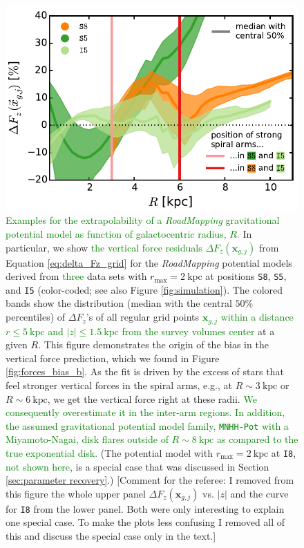 \documentclass[iop,revtex4,numberedappendix,appendixfloats]{emulateapj}
\newcommand{\vect}[1]{\boldsymbol{#1}}
\newcommand{\RM}{{\sl RoadMapping}}
\newcommand{\NEW}[1]{\textcolor{Green}{#1}}
\newcommand{\OLD}[1]{}
\newcommand{\COMMENT}[1]{\textcolor{ProcessBlue}{#1}}
\begin{document}
\begin{figure}[!htbp]
\centering
    \includegraphics[width=\columnwidth]{fig/MNdHHdiffSph2_Fg_vs_R_2.pdf}
\caption{\OLD{\RM{}'s ability to predict the vertical gravitational force as a function of the height above the plane, $|z|$, and galactocentric radius, $R$.}\NEW{Examples for the extrapolability of a \RM{} gravitational potential model as function of galactocentric radius, $R$.} In particular, we show \OLD{the predictive power, calculated}\NEW{the vertical force residuals $\Delta F_z(\vect{x}_{g,j})$} from Equation \eqref{eq:delta_Fz_grid}\OLD{,} for the \RM{} potential models derived from \OLD{the four}\NEW{three} data sets with $r_\text{max}=2~\text{kpc}$ at positions \texttt{S8}, \OLD{\texttt{I8},} \texttt{S5}, and \texttt{I5} (color-coded; see also Figure \ref{fig:simulation}). The colored bands show the distribution (median with the central $50\%$ percentiles) of $\Delta F_z$'s of all regular grid points \OLD{$g_j$}\NEW{$\vect{x}_{g,j}$} \NEW{within a distance $r\leq5~\text{kpc}$ and $|z|\leq1.5~\text{kpc}$ from the survey volumes center} at a given \OLD{$|z|$ or} $R$. This figure demonstrates the origin of the \OLD{strong} bias in the vertical force prediction, which we found in Figure \ref{fig:forces_bias_b}. As the fit is driven by the excess of stars that feel stronger vertical forces in the spiral arms, e.g., at $R\sim3~\text{kpc}$ or $R\sim6~\text{kpc}$, we get the vertical force right at these radii\OLD{ in the plane of the disk}. \NEW{We consequently overestimate it in the inter-arm regions. In addition, the assumed gravitational potential model family, \texttt{MNHH-Pot} with a Miyamoto-Nagai, disk flares outside of $R\sim8~\text{kpc}$ as compared to the true exponential disk.}\OLD{We consequently overestimate it in the smooth outer regions of the galaxy and at large heights above the plane, where the spiral arms don't play a role.} (The potential model with $r_\text{max}=2~\text{kpc}$ at \texttt{I8}, \OLD{light orange}\NEW{not shown here}, is a special case that was discussed in Section \ref{sec:parameter recovery}.) \COMMENT{[Comment for the referee: I removed from this figure the whole upper panel $\Delta F_z(\vect{x}_{g,j})$ vs. $|z|$ and the curve for \texttt{I8} from the lower panel. Both were only interesting to explain one special case. To make the plots less confusing I removed all of this and discuss the special case only in the text.]}}

\end{figure}
\end{document}
